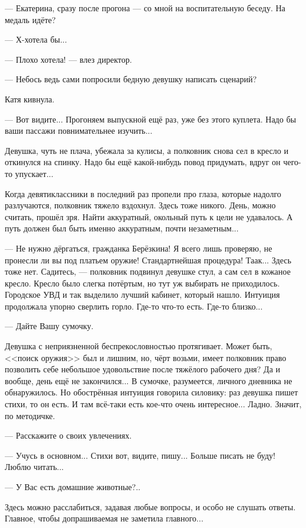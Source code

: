 --- Екатерина, сразу после прогона --- со мной на воспитательную беседу. На медаль идёте?

--- Х-хотела бы...

--- Плохо хотела! --- влез директор.

--- Небось ведь сами попросили бедную девушку написать сценарий?

Катя кивнула.

--- Вот видите... Прогоняем выпускной ещё раз, уже без этого куплета. Надо бы ваши пассажи повнимательнее изучить...

Девушка, чуть не плача, убежала за кулисы, а полковник снова сел в кресло и откинулся на спинку.
Надо бы ещё какой-нибудь повод придумать, вдруг он чего-то упускает...


Когда девятиклассники в последний раз пропели про глаза, которые надолго разлучаются,
полковник тяжело вздохнул.
Здесь тоже никого. День, можно считать, прошёл зря.
Найти аккуратный, окольный путь к цели не удавалось. А путь должен был быть именно аккуратным, почти незаметным...

\emptypar

--- Не нужно дёргаться, гражданка Берёзкина! Я всего лишь проверяю, не пронесли ли вы под платьем оружие!
Стандартнейшая процедура! Таак... Здесь тоже нет. Садитесь, ---
полковник подвинул девушке стул, а сам сел в кожаное кресло. Кресло было слегка потёртым, но тут уж выбирать не приходилось.
Городское УВД и так выделило лучший кабинет, который нашло.
Интуиция продолжала упорно сверлить горло. Где-то что-то есть. Где-то близко...

--- Дайте Вашу сумочку.

Девушка с неприязненной беспрекословностью протягивает.
Может быть, <<поиск оружия>> был и лишним, но, чёрт возьми,
имеет полковник право позволить себе небольшое удовольствие после тяжёлого рабочего дня?
Да и вообще, день ещё не закончился...
В сумочке, разумеется, личного дневника не обнаружилось. Но обострённая интуиция говорила силовику:
раз девушка пишет стихи, то он есть. И там всё-таки есть кое-что очень интересное... Ладно. Значит, по методичке.

--- Расскажите о своих увлечениях.

--- Учусь в основном... Стихи вот, видите, пишу... Больше писать не буду! Люблю читать...

--- У Вас есть домашние животные?..

Здесь можно расслабиться, задавая любые вопросы, и особо не слушать ответы. Главное, чтобы допрашиваемая не заметила главного...

